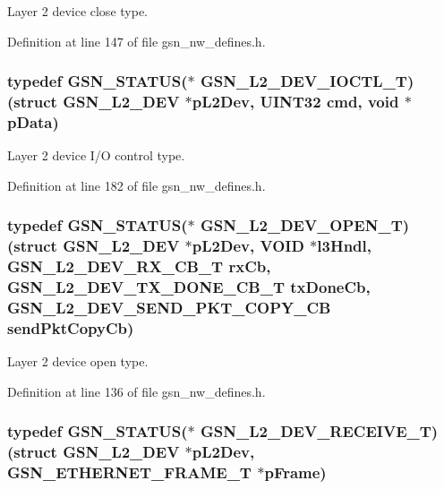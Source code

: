 Layer 2 device close type. 



Definition at line 147 of file gsn\_\-nw\_\-defines.h.

\hypertarget{a00670_gaeb9c0acdcf9376e138e61f00a424042a}{
\subsubsection[{GSN\_\-L2\_\-DEV\_\-IOCTL\_\-T}]{\setlength{\rightskip}{0pt plus 5cm}typedef {\bf GSN\_\-STATUS}($\ast$ {\bf GSN\_\-L2\_\-DEV\_\-IOCTL\_\-T})(struct {\bf GSN\_\-L2\_\-DEV} $\ast$pL2Dev, {\bf UINT32} cmd, void $\ast$pData)}}
\label{a00670_gaeb9c0acdcf9376e138e61f00a424042a}


Layer 2 device I/O control type. 



Definition at line 182 of file gsn\_\-nw\_\-defines.h.

\hypertarget{a00670_gaea3ffbbb6ea57c5335f9011b4dcfe651}{
\subsubsection[{GSN\_\-L2\_\-DEV\_\-OPEN\_\-T}]{\setlength{\rightskip}{0pt plus 5cm}typedef {\bf GSN\_\-STATUS}($\ast$ {\bf GSN\_\-L2\_\-DEV\_\-OPEN\_\-T})(struct {\bf GSN\_\-L2\_\-DEV} $\ast$pL2Dev, VOID $\ast$l3Hndl, {\bf GSN\_\-L2\_\-DEV\_\-RX\_\-CB\_\-T} rxCb, {\bf GSN\_\-L2\_\-DEV\_\-TX\_\-DONE\_\-CB\_\-T} txDoneCb, {\bf GSN\_\-L2\_\-DEV\_\-SEND\_\-PKT\_\-COPY\_\-CB} sendPktCopyCb)}}
\label{a00670_gaea3ffbbb6ea57c5335f9011b4dcfe651}


Layer 2 device open type. 



Definition at line 136 of file gsn\_\-nw\_\-defines.h.

\hypertarget{a00670_gaffd1598183dbe1898e975c2993aa4966}{
\subsubsection[{GSN\_\-L2\_\-DEV\_\-RECEIVE\_\-T}]{\setlength{\rightskip}{0pt plus 5cm}typedef {\bf GSN\_\-STATUS}($\ast$ {\bf GSN\_\-L2\_\-DEV\_\-RECEIVE\_\-T})(struct {\bf GSN\_\-L2\_\-DEV} $\ast$pL2Dev, {\bf GSN\_\-ETHERNET\_\-FRAME\_\-T} $\ast$pFrame)}}
\label{a00670_gaffd1598183dbe1898e975c2993aa4966}


